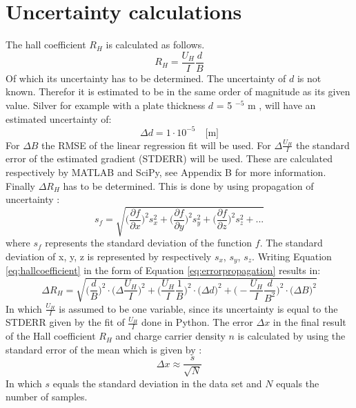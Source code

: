 \section{Uncertainty calculations}
The hall coefficient $R_H$ is calculated as follows.
    \begin{equation}
        R_H = \frac{U_H}{I} \frac{d}{B} \label{eq:hallcoefficient}
    \end{equation}
Of which its uncertainty has to be determined. The uncertainty of $d$ is not known. Therefor it is estimated to be in the same order of magnitude as its given value. Silver for example with a plate thickness $d$ = 5 $^{-5}$ m \cite{apparatus_silver}, will have an estimated uncertainty of:
    \begin{equation}
        \Delta d = 1\cdot 10^{-5} \quad \text{[m]}
    \end{equation}
For $\Delta B$ the RMSE of the linear regression fit will be used. For $\Delta \frac{U_H}{I}$ the standard error of the estimated gradient (STDERR) will be used. These are calculated respectively by MATLAB and SciPy, see Appendix B for more information. Finally $\Delta R_H$ has to be determined. This is done by using propagation of uncertainty \cite{error_propagation}:
    \begin{equation}
        s_f = \sqrt{\bigg(\frac{\partial f}{\partial x}\bigg)^2 s_x^2 +
        \bigg(\frac{\partial f}{\partial y}\bigg)^2 s_y^2 +
        \bigg(\frac{\partial f}{\partial z}\bigg)^2 s_z^2 + ...} \label{eq:errorpropagation}
    \end{equation}
where $s_f$ represents the standard deviation of the function $f$. The standard deviation of x, y, z is represented by respectively $s_x$, $s_y$, $s_z$. Writing Equation \ref{eq:hallcoefficient} in the form of Equation \ref{eq:errorpropagation} results in:
\begin{equation}
    \Delta R_H = \sqrt{
    \bigg(\frac{d}{B}\bigg)^2 \cdot \bigg(\Delta \frac{U_H}{I}\bigg)^2 +
    \bigg( \frac{U_H}{I} \frac{1}{B} \bigg)^2 \cdot \bigg( \Delta d \bigg)^2 +
    \bigg( - \frac{U_H}{I} \frac{d}{B^2}\bigg)^2 \cdot \bigg( \Delta B \bigg)^2
    }
\end{equation}
In which $\frac{U_H}{I}$ is assumed to be one variable, since its uncertainty is equal to the STDERR given by the fit of $\frac{U_H}{I}$ done in Python.
The error $\Delta x$ in the final result of the Hall coefficient $R_H$ and charge carrier density $n$ is calculated by using the standard error of the mean which is given by \cite{researchmethods}:
    \begin{equation}
        \Delta x \approx \frac{s}{\sqrt{N}}
    \end{equation}
In which $s$ equals the standard deviation in the data set and $N$ equals the number of samples.

